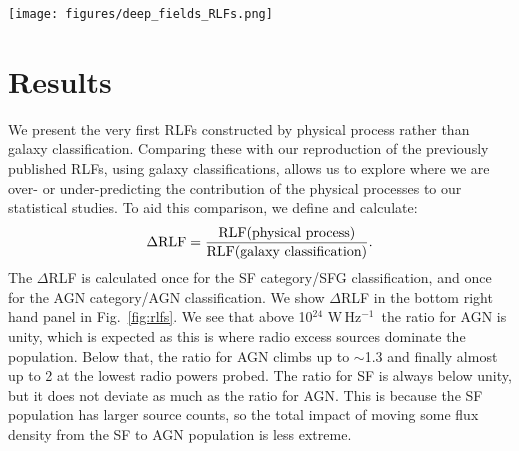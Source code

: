 \documentclass[usenatbib,fleqn,letters]{mnras}
\newcommand{\wphz}{$\,$W$\,$Hz$^{-1}$}
\begin{document}

\begin{figure*}
    \centering
    \texttt{[image: figures/deep\_fields\_RLFs.png]}
    \caption{\textit{Left:} Validation of our re-calculated galaxy RLFs (dotted lines) for the smaller area considered here with the previously published RLFs (solid lines). \textit{Middle:} RLFs calculated by process rather than galaxy. \textit{Right top:} RLFs calculated here by galaxy classifications (dotted lines) and by physical process (solid lines; orange for AGN and green for SF). \textit{Bottom right:} $\Delta$RLF for both AGN and SF. }
    \label{fig:rlfs}
\end{figure*}


\section{Results}
\label{sec:results}

We present the very first RLFs constructed by physical process rather than galaxy classification. Comparing these with our reproduction of the previously published RLFs, using galaxy classifications, allows us to explore where we are over- or under-predicting the contribution of the physical processes to our statistical studies. To aid this comparison, we define and calculate: 
\begin{equation}
\Delta\textrm{RLF} = \frac{\textrm{RLF(physical process)}}{\textrm{RLF(galaxy classification)}}. \notag
\end{equation}
The $\Delta$RLF is calculated once for the SF category/SFG classification, and once for the AGN category/AGN classification. We show $\Delta$RLF in the bottom right hand panel in Fig.~\ref{fig:rlfs}. We see that above 10$^{24}\,$\wphz\ the ratio for AGN is unity, which is expected as this is where radio excess sources dominate the population. Below that, the ratio for AGN climbs up to $\sim$1.3 and finally almost up to 2 at the lowest radio powers probed. The ratio for SF is always below unity, but it does not deviate as much as the ratio for AGN. This is because the SF population has larger source counts, so the total impact of moving some flux density from the SF to AGN population is less extreme. 
\end{document}
